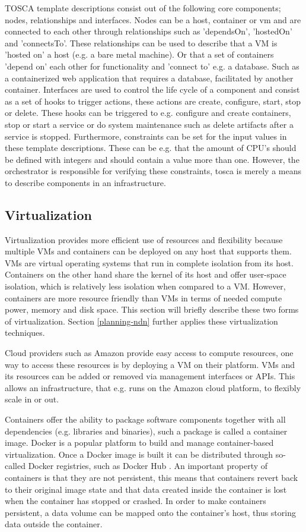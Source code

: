 TOSCA template descriptions consist out of the following core components; nodes, relationships and interfaces. Nodes can be a host, container or \gls{vm} and are connected to each other through relationships such as 'dependsOn', 'hostedOn' and 'connectsTo'. These relationships can be used to describe that a VM is 'hosted on' a host (e.g. a bare metal machine). Or that a set of containers 'depend on' each other for functionality and 'connect to' e.g. a database. Such as a containerized web application that requires a database, facilitated by another container. Interfaces are used to control the life cycle of a component and consist as a set of hooks to trigger actions, these actions are create, configure, start, stop or delete. These hooks can be triggered to e.g. configure and create containers, stop or start a service or do system maintenance such as delete artifacts after a service is stopped. Furthermore, constraints can be set for the input values in these template descriptions. These can be e.g. that the amount of CPU's should be defined with integers and should contain a value more than one. However, the orchestrator is responsible for verifying these constraints, \gls{tosca} is merely a means to describe components in an infrastructure.

\subsection{Virtualization}
\label{overview-virtualization}
Virtualization provides more efficient use of resources and flexibility because multiple VMs and containers can be deployed on any host that supports them. VMs are virtual operating systems that run in complete isolation from its host. Containers on the other hand share the kernel of its host and offer user-space isolation, which is relatively less isolation when compared to a VM. However, containers are more resource friendly than VMs in terms of needed compute power, memory and disk space. This section will briefly describe these two forms of virtualization. Section \ref{planning-ndn} further applies these virtualization techniques.

Cloud providers such as Amazon provide easy access to compute resources, one way to access these resources is by deploying a VM on their platform. VMs and its resources can be added or removed via management interfaces or APIs. This allows an infrastructure, that e.g. runs on the Amazon cloud platform, to flexibly scale in or out.

Containers offer the ability to package software components together with all dependencies (e.g. libraries and binaries), such a package is called a container image. Docker is a popular platform to build and manage container-based virtualization. Once a Docker image is built it can be distributed through so-called Docker registries, such as Docker Hub \cite{dockerhub-website}. An important property of containers is that they are not persistent, this means that containers revert back to their original image state and that data created inside the container is lost when the container has stopped or crashed. In order to make containers persistent, a data volume can be mapped onto the container's host, thus storing data outside the container.

